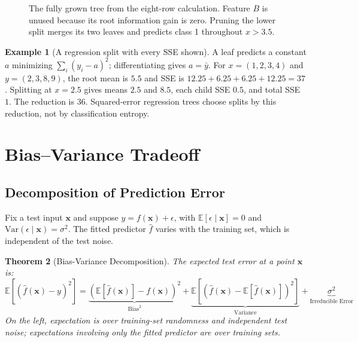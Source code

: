 \documentclass[11pt,twoside]{article}
\numberwithin{equation}{section}
\newcommand{\E}{\mathbb{E}}
\newcommand{\Var}{\mathrm{Var}}
\newcommand{\vect}[1]{\bm{#1}}
\theoremstyle{plain}
\newtheorem{theorem}{Theorem}[section]
\theoremstyle{definition}
\newtheorem{example}[theorem]{Example}
\theoremstyle{remark}
\begin{document}
\begin{figure}[H]
\centering
{}
\caption{The fully grown tree from the eight-row calculation. Feature $B$ is unused because its root information gain is zero. Pruning the lower split merges its two leaves and predicts class 1 throughout $x>3.5$.}
\end{figure}

\begin{example}[A regression split with every SSE shown]
A leaf predicts a constant $a$ minimizing $\sum_i(y_i-a)^2$; differentiating gives $a=\bar y$. For $x=(1,2,3,4)$ and $y=(2,3,8,9)$, the root mean is $5.5$ and SSE is $12.25+6.25+6.25+12.25=37$. Splitting at $x=2.5$ gives means $2.5$ and $8.5$, each child SSE $0.5$, and total SSE $1$. The reduction is $36$. Squared-error regression trees choose splits by this reduction, not by classification entropy.
\end{example}

\section{Bias--Variance Tradeoff}
\label{sec:bias-variance}

\subsection{Decomposition of Prediction Error}

Fix a test input $\vect{x}$ and suppose $y=f(\vect{x})+\epsilon$, with $\E[\epsilon\mid\vect{x}]=0$ and $\Var(\epsilon\mid\vect{x})=\sigma^2$. The fitted predictor $\hat f$ varies with the training set, which is independent of the test noise.

\begin{theorem}[Bias-Variance Decomposition]
The expected test error at a point $\vect{x}$ is:
\[
\E[(\hat{f}(\vect{x}) - y)^2] = \underbrace{(\E[\hat{f}(\vect{x})] - f(\vect{x}))^2}_{\text{Bias}^2} + \underbrace{\E[(\hat{f}(\vect{x}) - \E[\hat{f}(\vect{x})])^2]}_{\text{Variance}} + \underbrace{\sigma^2}_{\text{Irreducible Error}}
\]
On the left, expectation is over training-set randomness and independent test noise; expectations involving only the fitted predictor are over training sets.
\end{theorem}
\end{document}
